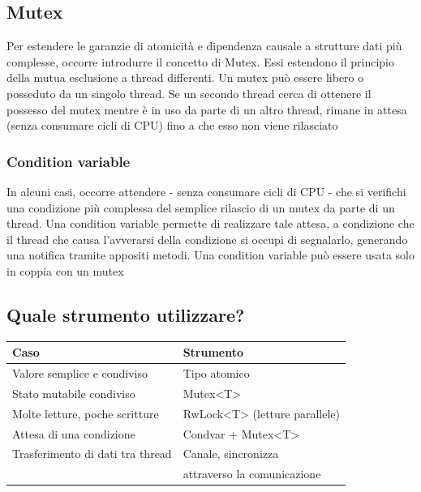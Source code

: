 \subsection{Mutex}
Per estendere le garanzie di atomicità e dipendenza causale a strutture dati più complesse, occorre introdurre il
concetto di Mutex.
Essi estendono il principio della mutua esclusione a thread differenti.
Un mutex può essere libero o posseduto da un singolo thread.
Se un secondo thread cerca di ottenere il possesso del mutex mentre è in uso da parte di un altro thread, rimane in
attesa (senza consumare cicli di CPU) fino a che esso non viene rilasciato

\subsubsection{Condition variable}
In alcuni casi, occorre attendere - senza consumare cicli di CPU - che si verifichi una condizione più complessa del
semplice rilascio di un mutex da parte di un thread.
Una condition variable permette di realizzare tale attesa, a condizione che il thread che causa l'avverarsi della
condizione si occupi di segnalarlo, generando una notifica tramite appositi metodi.
Una condition variable può essere usata solo in coppia con un mutex




\subsection{Quale strumento utilizzare?}


\begin{table}[h!]
  \renewcommand{\arraystretch}{1.5}
  \centering
  \begin{tabular}{l l}
    \toprule
    \textbf{Caso}                    & \textbf{Strumento}            \\
    \midrule
    Valore semplice e condiviso      & Tipo atomico                  \\
    Stato mutabile condiviso         & Mutex<T>                      \\
    Molte letture, poche scritture   & RwLock<T> (letture parallele) \\
    Attesa di una condizione         & Condvar + Mutex<T>            \\
    Trasferimento di dati tra thread & Canale, sincronizza           \\
                                     & attraverso la comunicazione   \\
    \bottomrule
  \end{tabular}
\end{table}



